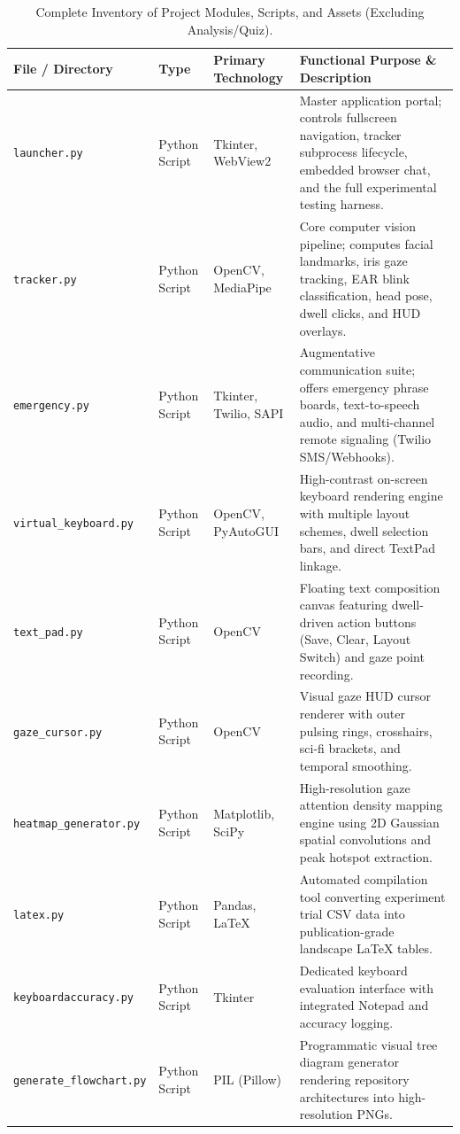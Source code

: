 \documentclass[11pt,a4paper]{article}
\begin{document}
\begin{table}[H]
\centering
\caption{Complete Inventory of Project Modules, Scripts, and Assets (Excluding Analysis/Quiz).}
\label{tab:file_inventory}
\small
\begin{tabularx}{\textwidth}{p{} p{} p{} X}
\toprule
\textbf{File / Directory} & \textbf{Type} & \textbf{Primary Technology} & \textbf{Functional Purpose \& Description} \\
\midrule
\texttt{launcher.py} & Python Script & Tkinter, WebView2 & Master application portal; controls fullscreen navigation, tracker subprocess lifecycle, embedded browser chat, and the full experimental testing harness. \\
\texttt{tracker.py} & Python Script & OpenCV, MediaPipe & Core computer vision pipeline; computes facial landmarks, iris gaze tracking, EAR blink classification, head pose, dwell clicks, and HUD overlays. \\
\texttt{emergency.py} & Python Script & Tkinter, Twilio, SAPI & Augmentative communication suite; offers emergency phrase boards, text-to-speech audio, and multi-channel remote signaling (Twilio SMS/Webhooks). \\
\texttt{virtual\_keyboard.py} & Python Script & OpenCV, PyAutoGUI & High-contrast on-screen keyboard rendering engine with multiple layout schemes, dwell selection bars, and direct TextPad linkage. \\
\texttt{text\_pad.py} & Python Script & OpenCV & Floating text composition canvas featuring dwell-driven action buttons (Save, Clear, Layout Switch) and gaze point recording. \\
\texttt{gaze\_cursor.py} & Python Script & OpenCV & Visual gaze HUD cursor renderer with outer pulsing rings, crosshairs, sci-fi brackets, and temporal smoothing. \\
\texttt{heatmap\_generator.py} & Python Script & Matplotlib, SciPy & High-resolution gaze attention density mapping engine using 2D Gaussian spatial convolutions and peak hotspot extraction. \\
\texttt{latex.py} & Python Script & Pandas, LaTeX & Automated compilation tool converting experiment trial CSV data into publication-grade landscape LaTeX tables. \\
\texttt{keyboardaccuracy.py} & Python Script & Tkinter & Dedicated keyboard evaluation interface with integrated Notepad and accuracy logging. \\
\texttt{generate\_flowchart.py}& Python Script & PIL (Pillow) & Programmatic visual tree diagram generator rendering repository architectures into high-resolution PNGs. \\

\end{tabularx}
\end{table}
\end{document}
